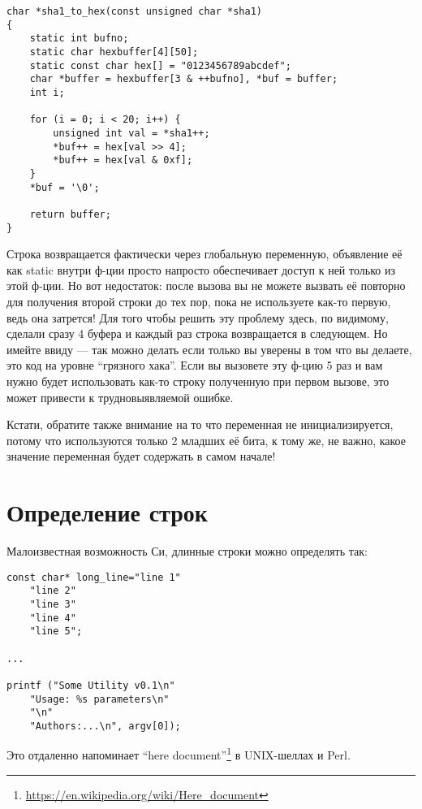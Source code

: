 \begin{lstlisting}
char *sha1_to_hex(const unsigned char *sha1)
{
	static int bufno;
	static char hexbuffer[4][50];
	static const char hex[] = "0123456789abcdef";
	char *buffer = hexbuffer[3 & ++bufno], *buf = buffer;
	int i;

	for (i = 0; i < 20; i++) {
		unsigned int val = *sha1++;
		*buf++ = hex[val >> 4];
		*buf++ = hex[val & 0xf];
	}
	*buf = '\0';

	return buffer;
}
\end{lstlisting}

Строка возвращается фактически через глобальную переменную, объявление её как static внутри ф-ции просто напросто
обеспечивает доступ к ней только из этой ф-ции. Но вот недостаток: после вызова  вы не можете
вызвать её повторно для получения второй строки до тех пор, пока не используете как-то первую, ведь она
затрется! Для того чтобы решить эту проблему здесь, по видимому, сделали сразу 4 буфера и каждый раз строка
возвращается в следующем. Но имейте ввиду --- так можно делать если только вы уверены в том что вы делаете,
это код на уровне ``грязного хака''.
Если вы
вызовете эту ф-цию 5 раз и вам нужно будет использовать как-то строку полученную при первом вызове, это может
привести к трудновыявляемой ошибке.

Кстати, обратите также внимание на то что переменная  не инициализируется, потому что используются только 
2 младших её бита, к тому же, не важно, какое значение переменная будет содержать в самом начале!

\section{Определение строк}

\label{heredoc}
Малоизвестная возможность Си, длинные строки можно определять так:

\begin{lstlisting}
const char* long_line="line 1"
	"line 2"
	"line 3"
	"line 4"
	"line 5";

...

printf ("Some Utility v0.1\n"
	"Usage: %s parameters\n"
	"\n"
	"Authors:...\n", argv[0]);
\end{lstlisting}

Это отдаленно напоминает ``here document''\footnote{\url{https://en.wikipedia.org/wiki/Here_document}} в 
UNIX-шеллах и Perl.

